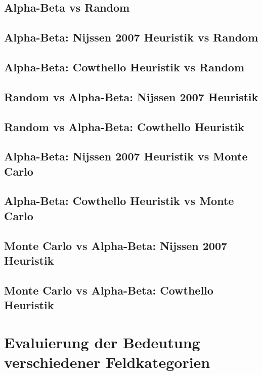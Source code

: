 \subsection{Alpha-Beta vs Random}

\subsection{Alpha-Beta: Nijssen 2007 Heuristik vs Random}

\subsection{Alpha-Beta: Cowthello Heuristik vs Random}

\subsection{Random vs Alpha-Beta: Nijssen 2007 Heuristik}

\subsection{Random vs Alpha-Beta: Cowthello Heuristik}

\subsection{Alpha-Beta: Nijssen 2007 Heuristik vs Monte Carlo}

\subsection{Alpha-Beta: Cowthello Heuristik vs Monte Carlo}

\subsection{Monte Carlo vs Alpha-Beta: Nijssen 2007 Heuristik}

\subsection{Monte Carlo vs Alpha-Beta: Cowthello Heuristik}

\section{Evaluierung der Bedeutung verschiedener Feldkategorien}
